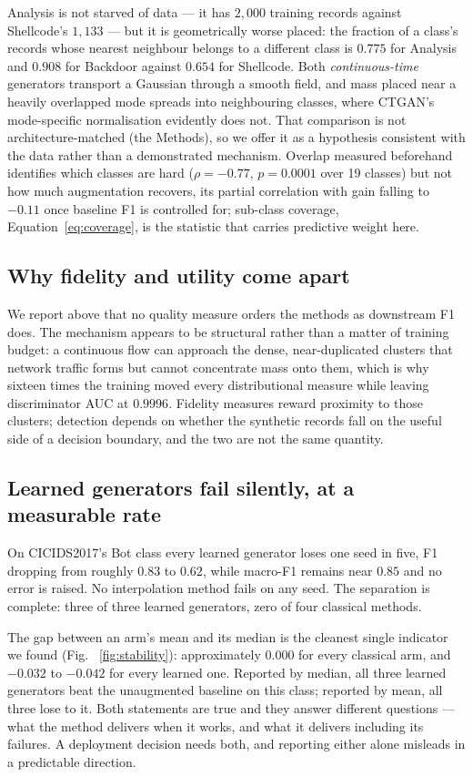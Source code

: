 \documentclass[11pt]{article}
\begin{document}
Analysis is not starved of data --- it has $2{,}000$ training records against
Shellcode's $1{,}133$ --- but it is geometrically worse placed: the fraction of a
class's records whose nearest neighbour belongs to a different class is $0.775$ for
Analysis and $0.908$ for Backdoor against $0.654$ for Shellcode. Both
\emph{continuous-time} generators transport a Gaussian through a smooth field, and
mass placed near a heavily overlapped mode spreads into neighbouring classes, where
CTGAN's mode-specific normalisation evidently does not. That comparison is not
architecture-matched (the Methods), so we offer it as a hypothesis
consistent with the data rather than a demonstrated mechanism. Overlap measured
beforehand identifies which classes are hard ($\rho=-0.77$, $p=0.0001$ over 19
classes) but not how much augmentation recovers, its partial correlation with gain
falling to $-0.11$ once baseline F1 is controlled for; sub-class coverage,
Equation~\eqref{eq:coverage}, is the statistic that carries predictive weight here.

\subsection*{Why fidelity and utility come apart}

We report above that no quality measure orders the methods as
downstream F1 does. The mechanism appears to be structural rather than a matter of
training budget: a continuous flow can approach the dense, near-duplicated clusters
that network traffic forms but cannot concentrate mass onto them, which is why
sixteen times the training moved every distributional measure while leaving
discriminator AUC at $0.9996$. Fidelity measures reward proximity to those clusters;
detection depends on whether the synthetic records fall on the useful side of a
decision boundary, and the two are not the same quantity.

\subsection*{Learned generators fail silently, at a measurable rate}

On CICIDS2017's Bot class every learned generator loses one seed in five, F1
dropping from roughly $0.83$ to $0.62$, while macro-F1 remains near $0.85$ and no
error is raised. No interpolation method fails on any seed. The separation is
complete: three of three learned generators, zero of four classical methods.

The gap between an arm's mean and its median is the cleanest single indicator we
found (Fig.~
\ref{fig:stability}): approximately $0.000$ for every classical arm, and $-0.032$ to $-0.042$ for
every learned one. Reported by median, all three learned generators beat the
unaugmented baseline on this class; reported by mean, all three lose to it. Both
statements are true and they answer different questions --- what the method delivers
when it works, and what it delivers including its failures. A deployment decision
needs both, and reporting either alone misleads in a predictable direction.
\end{document}
